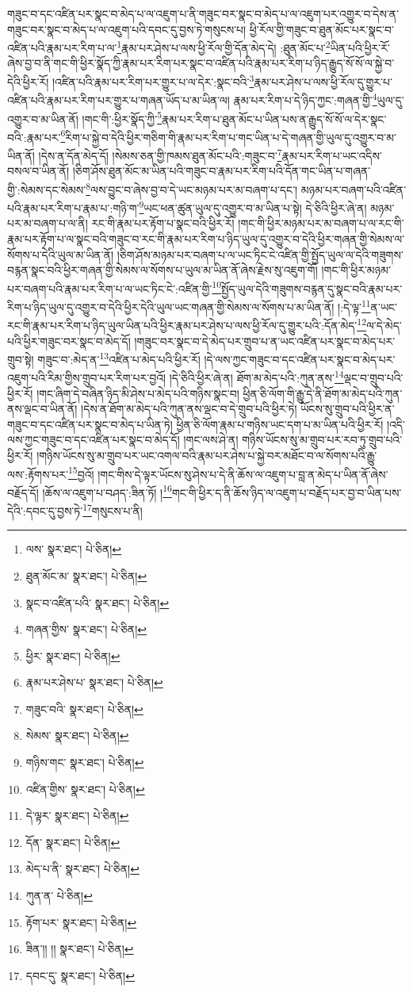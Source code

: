 གཟུང་བ་དང་འཛིན་པར་སྣང་བ་མེད་པ་ལ་འཇུག་པ་ནི་གཟུང་བར་སྣང་བ་མེད་པ་ལ་འཇུག་པར་འགྱུར་བ་དེས་ན་གཟུང་བར་སྣང་བ་མེད་པ་ལ་འཇུག་པའི་དབང་དུ་བྱས་ཏེ་གསུངས་པ། ཕྱི་རོལ་གྱི་གཟུང་བ་ཐུན་མོང་པར་སྣང་བ་འཛིན་པའི་རྣམ་པར་རིག་པ་ལ་\footnote{ལས་  སྣར་ཐང་།  པེ་ཅིན། }རྣམ་པར་ཤེས་པ་ལས་ཕྱི་རོལ་གྱི་དོན་མེད་དེ། :ཐུན་མོང་པ་\footnote{ཐུན་མོང་མ་  སྣར་ཐང་།  པེ་ཅིན། }ཡིན་པའི་ཕྱིར་རོ་ཞེས་བྱ་བ་ནི་གང་གི་ཕྱིར་སྣོད་ཀྱི་རྣམ་པར་རིག་པར་སྣང་བ་འཛིན་པའི་རྣམ་པར་རིག་པ་ཉིད་རྒྱུད་སོ་སོ་ལ་སྐྱེ་བ་དེའི་ཕྱིར་རོ། །འཛིན་པའི་རྣམ་པར་རིག་པར་གྱུར་པ་ལ་དེར་:སྣང་བའི་\footnote{སྣང་བ་འཛིན་པའི་  སྣར་ཐང་།  པེ་ཅིན། }རྣམ་པར་ཤེས་པ་ལས་ཕྱི་རོལ་དུ་གྱུར་པ་འཛིན་པའི་རྣམ་པར་རིག་པར་གྱུར་པ་གཞན་ཡོད་པ་མ་ཡིན་ལ། རྣམ་པར་རིག་པ་དེ་ཉིད་ཀྱང་:གཞན་གྱི་\footnote{གཞན་གྱིས་  སྣར་ཐང་།  པེ་ཅིན། }ཡུལ་དུ་འགྱུར་བ་མ་ཡིན་ནོ། །གང་གི་:ཕྱིར་སྣོད་ཀྱི་\footnote{ཕྱིར་  སྣར་ཐང་།  པེ་ཅིན། }རྣམ་པར་རིག་པ་ཐུན་མོང་པ་ཡིན་པས་ན་རྒྱུད་སོ་སོ་ལ་དེར་སྣང་བའི་:རྣམ་པར་\footnote{རྣམ་པར་ཤེས་པ་  སྣར་ཐང་།  པེ་ཅིན། }རིག་པ་སྐྱེ་བ་དེའི་ཕྱིར་གཅིག་གི་རྣམ་པར་རིག་པ་གང་ཡིན་པ་དེ་གཞན་གྱི་ཡུལ་དུ་འགྱུར་བ་མ་ཡིན་ནོ། །དེས་ན་དོན་མེད་དོ། །སེམས་ཅན་གྱི་ཁམས་ཐུན་མོང་པའི་:གཟུང་བ་\footnote{གཟུང་བའི་  སྣར་ཐང་།  པེ་ཅིན། }རྣམ་པར་རིག་པ་ཡང་འདིས་བསལ་བ་ཡིན་ནོ། །ཅིག་ཤོས་ཐུན་མོང་མ་ཡིན་པའི་གཟུང་བ་རྣམ་པར་རིག་པའི་དོན་གང་ཡིན་པ་གཞན་གྱི་:སེམས་དང་སེམས་\footnote{སེམས་  སྣར་ཐང་།  པེ་ཅིན། }ལས་བྱུང་བ་ཞེས་བྱ་བ་དེ་ཡང་མཉམ་པར་མ་བཞག་པ་དང་། མཉམ་པར་བཞག་པའི་འཛིན་པའི་རྣམ་པར་རིག་པ་རྣམ་པ་:གཉི་ག་\footnote{གཉིས་གང་  སྣར་ཐང་།  པེ་ཅིན། }ཡང་ཕན་ཚུན་ཡུལ་དུ་འགྱུར་བ་མ་ཡིན་པ་སྟེ། དེ་ཅིའི་ཕྱིར་ཞེ་ན། མཉམ་པར་མ་བཞག་པ་ལ་ནི། རང་གི་རྣམ་པར་རྟོག་པ་སྣང་བའི་ཕྱིར་རོ། །གང་གི་ཕྱིར་མཉམ་པར་མ་བཞག་པ་ལ་རང་གི་རྣམ་པར་རྟོག་པ་ལ་སྣང་བའི་གཟུང་བ་རང་གི་རྣམ་པར་རིག་པ་ཉིད་ཡུལ་དུ་འགྱུར་བ་དེའི་ཕྱིར་གཞན་གྱི་སེམས་ལ་སོགས་པ་དེའི་ཡུལ་མ་ཡིན་ནོ། །ཅིག་ཤོས་མཉམ་པར་བཞག་པ་ལ་ཡང་ཏིང་ངེ་འཛིན་གྱི་སྤྱོད་ཡུལ་ལ་དེའི་གཟུགས་བརྙན་སྣང་བའི་ཕྱིར་གཞན་གྱི་སེམས་ལ་སོགས་པ་ཡུལ་མ་ཡིན་ནོ་ཞེས་རྗེས་སུ་འཇུག་གོ། །གང་གི་ཕྱིར་མཉམ་པར་བཞག་པའི་རྣམ་པར་རིག་པ་ལ་ཡང་ཏིང་ངེ་:འཛིན་གྱི་\footnote{འཛིན་གྱིས་  སྣར་ཐང་།  པེ་ཅིན། }སྤྱོད་ཡུལ་དེའི་གཟུགས་བརྙན་དུ་སྣང་བའི་རྣམ་པར་རིག་པ་ཉིད་ཡུལ་དུ་འགྱུར་བ་དེའི་ཕྱིར་དེའི་ཡུལ་ཡང་གཞན་གྱི་སེམས་ལ་སོགས་པ་མ་ཡིན་ནོ། །:དེ་ལྟ་\footnote{དེ་ལྟར་  སྣར་ཐང་།  པེ་ཅིན། }ན་ཡང་རང་གི་རྣམ་པར་རིག་པ་ཉིད་ཡུལ་ཡིན་པའི་ཕྱིར་རྣམ་པར་ཤེས་པ་ལས་ཕྱི་རོལ་དུ་གྱུར་པའི་:དོན་མེད་\footnote{དོན་  སྣར་ཐང་།  པེ་ཅིན། }ལ་དེ་མེད་པའི་ཕྱིར་གཟུང་བར་སྣང་བ་མེད་དོ། །གཟུང་བར་སྣང་བ་དེ་མེད་པར་གྲུབ་པ་ན་ཡང་འཛིན་པར་སྣང་བ་མེད་པར་གྲུབ་སྟེ། གཟུང་བ་:མེད་ན་\footnote{མེད་པ་ནི་  སྣར་ཐང་།  པེ་ཅིན། }འཛིན་པ་མེད་པའི་ཕྱིར་རོ། །དེ་ལས་ཀྱང་གཟུང་བ་དང་འཛིན་པར་སྣང་བ་མེད་པར་འཇུག་པའི་རིམ་གྱིས་གྲུབ་པར་རིག་པར་བྱའོ། །དེ་ཅིའི་ཕྱིར་ཞེ་ན། ཐོག་མ་མེད་པའི་:ཀུན་ནས་\footnote{ཀུན་ན་  པེ་ཅིན། }ལྡང་བ་གྲུབ་པའི་ཕྱིར་རོ། །གང་ཞིག་དེ་བཞིན་ཉིད་མི་ཤེས་པ་མེད་པའི་གཉིས་སྣང་བ། ཕྱིན་ཅི་ལོག་གི་རྒྱུ་དེ་ནི་ཐོག་མ་མེད་པའི་ཀུན་ནས་ལྡང་བ་ཡིན་ནོ། །དེས་ན་ཐོག་མ་མེད་པའི་ཀུན་ནས་ལྡང་བ་དེ་གྲུབ་པའི་ཕྱིར་ཏེ། ཡོངས་སུ་གྲུབ་པའི་ཕྱིར་ན་གཟུང་བ་དང་འཛིན་པར་སྣང་བ་མེད་པ་ཡིན་ཏེ། ཕྱིན་ཅི་ལོག་རྣམ་པ་གཉིས་ཡང་དག་པ་མ་ཡིན་པའི་ཕྱིར་རོ། །འདི་ལས་ཀྱང་གཟུང་བ་དང་འཛིན་པར་སྣང་བ་མེད་དོ། །གང་ལས་ཤེ་ན། གཉིས་ཡོངས་སུ་མ་གྲུབ་པར་རབ་ཏུ་གྲུབ་པའི་ཕྱིར་རོ། །གཉིས་ཡོངས་སུ་མ་གྲུབ་པར་ཡང་འགལ་བའི་རྣམ་པར་ཤེས་པ་སྐྱེ་བར་མཐོང་བ་ལ་སོགས་པའི་རྒྱུ་ལས་:རྟོགས་པར་\footnote{རྟོག་པར་  སྣར་ཐང་།  པེ་ཅིན། }བྱའོ། །གང་གིས་དེ་ལྟར་ཡོངས་སུ་ཤེས་པ་དེ་ནི་ཆོས་ལ་འཇུག་པ་བླ་ན་མེད་པ་ཡིན་ནོ་ཞེས་བརྗོད་དོ། །ཆོས་ལ་འཇུག་པ་བཤད་:ཟིན་ཏོ། །\footnote{ཟིན་།། །།  སྣར་ཐང་།  པེ་ཅིན། }གང་གི་ཕྱིར་ད་ནི་ཆོས་ཉིད་ལ་འཇུག་པ་བརྗོད་པར་བྱ་བ་ཡིན་པས་དེའི་:དབང་དུ་བྱས་ཏེ་\footnote{དབང་དུ་  སྣར་ཐང་།  པེ་ཅིན། }གསུངས་པ་ནི། 